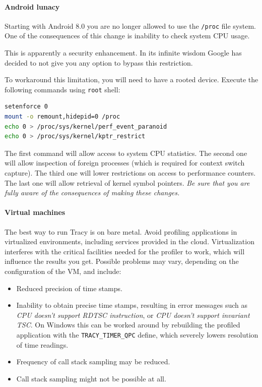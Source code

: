 \documentclass[hidelinks,titlepage,a4paper]{article}
\begin{document}
\paragraph{Android lunacy}
\label{androidlunacy}

Starting with Android 8.0 you are no longer allowed to use the \texttt{/proc} file system. One of the consequences of this change is inability to check system CPU usage.

This is apparently a security enhancement. In its infinite wisdom Google has decided to not give you any option to bypass this restriction.

To workaround this limitation, you will need to have a rooted device. Execute the following commands using \texttt{root} shell:

\begin{lstlisting}[language=sh]
setenforce 0
mount -o remount,hidepid=0 /proc
echo 0 > /proc/sys/kernel/perf_event_paranoid
echo 0 > /proc/sys/kernel/kptr_restrict
\end{lstlisting}

The first command will allow access to system CPU statistics. The second one will allow inspection of foreign processes (which is required for context switch capture). The third one will lower restrictions on access to performance counters. The last one will allow retrieval of kernel symbol pointers. \emph{Be sure that you are fully aware of the consequences of making these changes.}

\paragraph{Virtual machines}

The best way to run Tracy is on bare metal. Avoid profiling applications in virtualized environments, including services provided in the cloud. Virtualization interferes with the critical facilities needed for the profiler to work, which will influence the results you get. Possible problems may vary, depending on the configuration of the VM, and include:

\begin{itemize}
\item Reduced precision of time stamps.
\item Inability to obtain precise time stamps, resulting in error messages such as \emph{CPU doesn't support RDTSC instruction}, or \emph{CPU doesn't support invariant TSC}. On Windows this can be worked around by rebuilding the profiled application with the \texttt{TRACY\_TIMER\_QPC} define, which severely lowers resolution of time readings.
\item Frequency of call stack sampling may be reduced.
\item Call stack sampling might not be possible at all.
\end{itemize}
\end{document}
